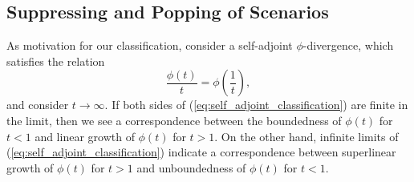 \documentclass[opre,nonblindrev]{informs3} %
\begin{document}
\subsection{Suppressing and Popping of Scenarios}
\label{ssec:suppressandpop}

As motivation for our classification, consider a self-adjoint $\phi$-divergence, which satisfies the relation
\begin{equation} \label{eq:self_adjoint_classification}
	\frac{\phi(t)}{t} = \phi\left(\frac{1}{t}\right),
\end{equation}
and consider $t \rightarrow \infty$.
If both sides of (\ref{eq:self_adjoint_classification}) are finite in the limit, then we see a correspondence between the boundedness of $\phi(t)$ for $t < 1$ and linear growth of $\phi(t)$ for $t > 1$.
On the other hand, infinite limits of (\ref{eq:self_adjoint_classification}) indicate a correspondence between superlinear growth of $\phi(t)$ for $t > 1$ and unboundedness of $\phi(t)$ for $t < 1$.
\end{document}
